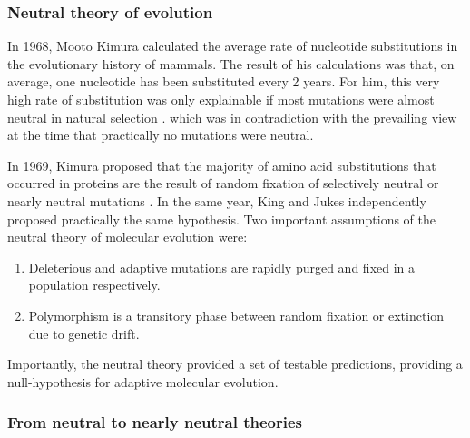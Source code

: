\subsubsection{Neutral theory of evolution}
In 1968, Mooto Kimura calculated the average rate of nucleotide substitutions in the evolutionary history of mammals.
The result of his calculations was that, on average, one nucleotide has been substituted every 2 years.
For him, this very high rate of substitution was only explainable if most mutations were almost neutral in natural selection 
	\citep{Kimura1968}.
which was in contradiction with the prevailing view at the time that practically no mutations were neutral.

In 1969, Kimura proposed that the majority of amino acid substitutions that occurred in proteins are the result of random fixation of selectively neutral or nearly neutral mutations  \citep{Kimura1969}. In the same year, King and Jukes \citep{King1969} independently proposed practically the same hypothesis.
%
Two important assumptions of the neutral theory of molecular evolution were:

\begin{enumerate}
\item Deleterious and adaptive mutations are rapidly purged and fixed in a population respectively.
\item Polymorphism is a transitory phase between random fixation or extinction due to genetic drift.
\end{enumerate}

Importantly, the neutral theory provided a set of testable predictions, providing a null-hypothesis for adaptive molecular evolution.

\subsubsection{From neutral to nearly neutral theories}

